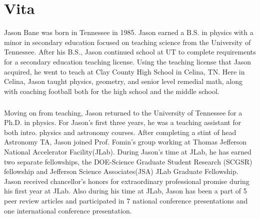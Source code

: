 \chapter*{Vita} \label{ch:vita}

Jason Bane was born in Tennessee in 1985. Jason earned a B.S. in physics with a minor in secondary education focused on teaching science from the University of Tennessee. After his B.S., Jason continued school at UT to complete requirements for a secondary education teaching license. Using the teaching license that Jason acquired, he went to teach at Clay County High School in Celina, TN. Here in Celina, Jason taught physics, geometry, and senior level remedial math, along with coaching football both for the high school and the middle school. 
\paragraph{}Moving on from teaching, Jason returned to the University of Tennessee for a Ph.D. in physics. For Jason's first three years, he was a teaching assistant for both intro. physics and astronomy courses. After completing a stint of head Astronomy TA, Jason joined Prof. Fomin's group working at Thomas Jefferson National Accelerator Facility(JLab). During Jason's time at JLab, he has earned two separate fellowships, the DOE-Science Graduate Student Research (SCGSR) fellowship and Jefferson Science Associates(JSA) JLab Graduate Fellowship. Jason received chancellor’s honors for extraordinary professional promise during his first year at JLab.  Also during his time at JLab, Jason has been a part of 5 peer review articles and participated in 7 national conference presentations and one international conference presentation. 





